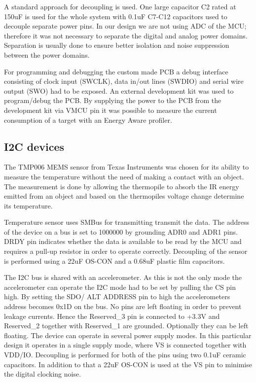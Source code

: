 A standard approach for decoupling is used. One large capacitor C2 rated at 150uF is used for the whole system with 0.1uF C7-C12 capacitors used to decouple separate power pins. In our design we are not using ADC of the MCU; therefore it was not necessary to separate the digital and analog power domains. Separation is usually done to ensure better isolation and noise suppression between the power domains.


For programming and debugging the custom made PCB a debug interface consisting of clock input (SWCLK), data in/out lines (SWDIO) and serial wire output (SWO) had to be exposed. An external development kit was used to program/debug the PCB. By supplying the power to the PCB from the development kit via VMCU pin it was possible to measure the current consumption of a target with an Energy Aware profiler.


\subsection{I2C devices}
The TMP006 MEMS sensor from Texas Instruments was chosen for its ability to measure the temperature without the need of making a contact with an object. The measurement is done by allowing the thermopile to absorb the IR energy emitted from an object and based on the thermopiles voltage change determine its temperature.

Temperature sensor uses SMBus for transmitting transmit the data. The address of the device on a bus is set to 1000000 by grounding ADR0 and ADR1 pins. DRDY pin indicates whether the data is available to be read by the MCU and requires a pull-up resistor in order to operate correctly. Decoupling of the sensor is performed using a 22uF OS-CON and a 0.68uF plastic film capacitors.

The I2C bus is shared with an accelerometer. As this is not the only mode the accelerometer can operate the I2C mode had to be set by pulling the CS pin high. By setting the SDO/ ALT ADDRESS pin to high the accelerometers address becomes 0x1D on the bus. No pins are left floating in order to prevent leakage currents. Hence the Reserved\_3 pin is connected to +3.3V and Reserved\_2 together with Reserved\_1 are grounded. Optionally they can be left floating. 
The device can operate in several power supply modes. In this particular design it operates in a single supply mode, where VS is connected together with VDD/IO. Decoupling is performed for both of the pins using two 0.1uF ceramic capacitors. In addition to that a 22uF OS-CON is used at the VS pin to minimise the digital clocking noise.

